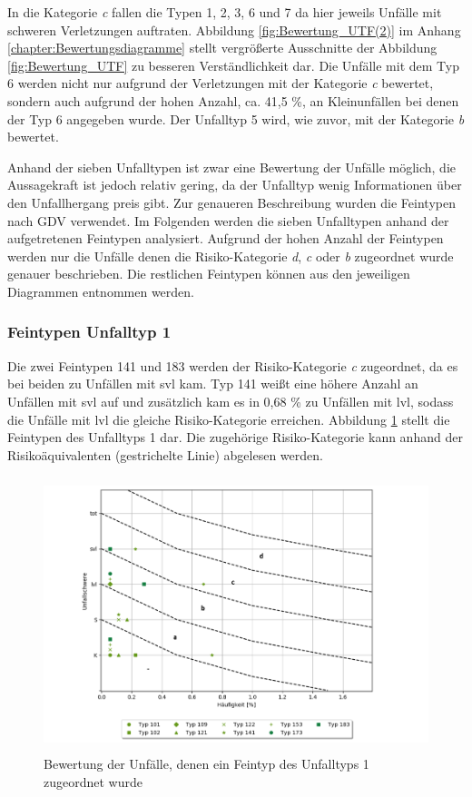 In die Kategorie \textit{c} fallen die Typen 1, 2, 3, 6 und 7 da hier jeweils Unfälle mit schweren Verletzungen auftraten. Abbildung \ref{fig:Bewertung_UTF(2)} im Anhang \ref{chapter:Bewertungsdiagramme} stellt vergrößerte Ausschnitte der Abbildung \ref{fig:Bewertung_UTF} zu besseren Verständlichkeit dar. Die Unfälle mit dem Typ 6 werden nicht nur aufgrund der Verletzungen mit der Kategorie \textit{c} bewertet, sondern auch aufgrund der hohen Anzahl, ca. 41,5 \%, an Kleinunfällen bei denen der Typ 6 angegeben wurde. Der Unfalltyp 5 wird, wie zuvor, mit der Kategorie \textit{b} bewertet.

Anhand der sieben Unfalltypen ist zwar eine Bewertung der Unfälle möglich, die Aussagekraft ist jedoch relativ gering, da der Unfalltyp wenig Informationen über den Unfallhergang preis gibt. Zur genaueren Beschreibung wurden die Feintypen nach GDV verwendet. Im Folgenden werden die sieben Unfalltypen anhand der aufgetretenen Feintypen analysiert. Aufgrund der hohen Anzahl der Feintypen werden nur die Unfälle denen die Risiko-Kategorie \textit{d}, \textit{c} oder \textit{b} zugeordnet wurde genauer beschrieben. Die restlichen Feintypen können aus den jeweiligen Diagrammen entnommen werden.

\subsubsection{Feintypen Unfalltyp 1}
Die zwei Feintypen 141 und 183 werden der Risiko-Kategorie \textit{c} zugeordnet, da es bei beiden zu Unfällen mit \ac{svl} kam. Typ 141 weißt eine höhere Anzahl an Unfällen mit \ac{svl} auf und zusätzlich kam es in 0,68 \% zu Unfällen mit \ac{lvl}, sodass die Unfälle mit \ac{lvl} die gleiche Risiko-Kategorie erreichen. Abbildung \ref{fig:Bewertung_FT1} stellt die Feintypen des Unfalltyps 1 dar. Die zugehörige Risiko-Kategorie kann anhand der Risikoäquivalenten (gestrichelte Linie) abgelesen werden.

\begin{savenotes}
	\begin{figure}[H]
		\centering
		\includegraphics[width=12cm,height=8cm]{figures/Bewertung_FT1}
		\caption[Bewertung der Unfälle, denen ein Feintyp des Unfalltyps 1 zugeordnet wurde]{Bewertung der Unfälle, denen ein Feintyp des Unfalltyps 1 zugeordnet wurde}\label{fig:Bewertung_FT1}
	\end{figure}
\end{savenotes}

